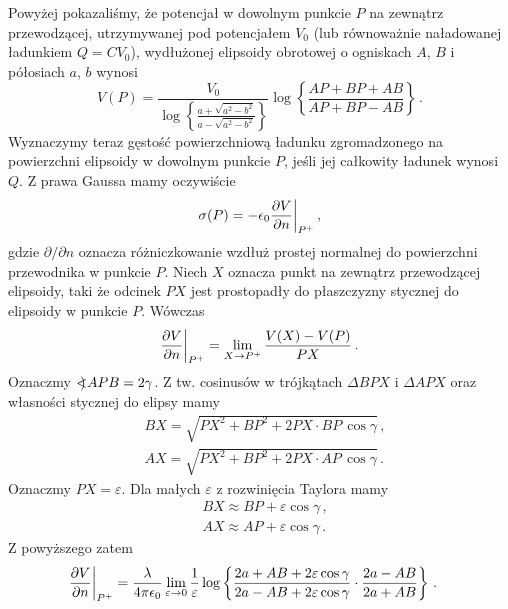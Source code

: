 \documentclass[../main.tex]{subfiles}
\begin{document}
\begin{enumerate}
Powyżej pokazaliśmy, że potencjał w dowolnym punkcie \(P\) na zewnątrz przewodzącej, utrzymywanej
pod potencjałem \(V_0\) (lub równoważnie naładowanej ładunkiem \(Q=CV_0\)), wydłużonej elipsoidy
obrotowej o ogniskach \(A\), \(B\) i półosiach \(a\), \(b\) wynosi
\begin{equation*}
    V(P)=\frac{V_0}{\log\left\{\frac{a+\sqrt{a^2-b^2}}{a-\sqrt{a^2-b^2}}\right\}}\log\left\{\frac{AP+BP+AB}{AP+BP-AB}\right\}\,.
\end{equation*}
 Wyznaczymy teraz gęstość powierzchniową ładunku zgromadzonego na powierzchni elipsoidy w dowolnym
 punkcie \(P\), jeśli jej całkowity ładunek wynosi \(Q\). Z prawa Gaussa mamy oczywiście
\begin{equation*}
    \sigma(P)=-\epsilon_0\pdv{V}{n}\bigg|_{P^+}\,,
\end{equation*}
gdzie \(\partial/\partial n\) oznacza różniczkowanie wzdłuż prostej normalnej do powierzchni
przewodnika w punkcie \(P\). Niech \(X\) oznacza punkt na zewnątrz przewodzącej elipsoidy, taki że
odcinek \(PX\) jest prostopadły do płaszczyzny stycznej do elipsoidy w punkcie  \(P\). Wówczas
\begin{equation*}
   \pdv{V}{n}\bigg|_{P^+}=\lim_{X\to {P^+}}\frac{V(X)-V(P)}{PX}\,.
\end{equation*}
Oznaczmy \(\mathord{<\mspace{-9mu}\mathrel{)}\mspace{2mu}} APB=2\gamma\). Z tw. cosinusów w trójkątach \(\Delta BPX\) i \(\Delta APX\)
oraz własności stycznej do elipsy mamy
\begin{equation*}
    \begin{split}
        &BX=\sqrt{PX^2+BP^2+2PX\cdot BP\,\cos\gamma}\,,\\
        &AX=\sqrt{PX^2+BP^2+2PX\cdot AP\,\cos\gamma}\,.
    \end{split}
\end{equation*}
Oznaczmy \(PX=\varepsilon\). Dla małych \(\varepsilon\) z rozwinięcia Taylora mamy
\begin{equation*}
\begin{split}
     &BX\approx BP+\varepsilon \cos\gamma\,,\\
     &AX\approx AP+\varepsilon \cos\gamma\,.
\end{split}
\end{equation*}
Z powyższego zatem
\begin{equation*}
\begin{split}
    &\pdv{V}{n}\bigg|_{P^+}=\frac{\lambda}{4\pi\epsilon_0}\lim_{\varepsilon\to 0}\frac{1}{\varepsilon}\log\left\{\frac{2a+AB+2\varepsilon\cos\gamma}{2a-AB+2\varepsilon\cos\gamma}\cdot\frac{2a-AB}{2a+AB}\right\}\,.

\end{split}
\end{equation*}
\end{enumerate}
\end{document}
